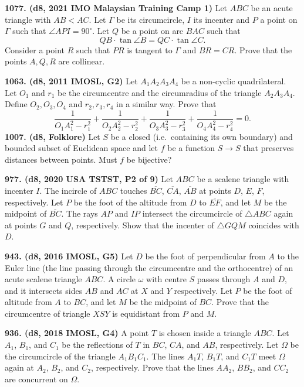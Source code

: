 \documentclass{article}
\begin{document}
\textbf{1077. (\color{red}d8\color{black}, 2021 IMO Malaysian Training Camp 1)} Let $ABC$ be an acute triangle with $AB<AC$. Let $\Gamma$ be its circumcircle, $I$ its incenter and $P$ a point on $\Gamma$ such that $\angle API=90^{\circ}$. Let $Q$ be a point on arc $BAC$ such that $$QB\cdot\tan \angle B=QC\cdot \tan \angle C.$$ Consider a point $R$ such that $PR$ is tangent to $\Gamma$ and $BR=CR$. Prove that the points $A, Q, R$ are collinear.

\textbf{1063. (\color{red}d8\color{black}, 2011 IMOSL, G2)} Let $A_1A_2A_3A_4$ be a non-cyclic quadrilateral. Let $O_1$ and $r_1$ be the circumcentre and the circumradius of the triangle $A_2A_3A_4$. Define $O_2,O_3,O_4$ and $r_2,r_3,r_4$ in a similar way. Prove that
\[\frac{1}{O_1A_1^2-r_1^2}+\frac{1}{O_2A_2^2-r_2^2}+\frac{1}{O_3A_3^2-r_3^2}+\frac{1}{O_4A_4^2-r_4^2}=0.\]
\textbf{1007. (\color{red}d8\color{black}, Folklore)} Let $S$ be a closed (i.e.\ containing its own boundary) and bounded subset of Euclidean space and let $f$ be a function $S \to S$ that preserves distances between points. Must $f$ be bijective?

\textbf{977. (\color{red}d8\color{black}, 2020 USA TSTST, P2 of 9)} Let $ABC$ be a scalene triangle with incenter $I$. The incircle of $ABC$ touches $\overline{BC}$, $\overline{CA}$, $\overline{AB}$ at points $D$, $E$, $F$, respectively. Let $P$ be the foot of the altitude from $D$ to $\overline{EF}$, and let $M$ be the midpoint of $\overline{BC}$. The rays $AP$ and $IP$ intersect the circumcircle of $\triangle{ABC}$ again at points $G$ and $Q$, respectively. Show that the incenter of $\triangle{GQM}$ coincides with $D$.

\textbf{943. (\color{red}d8\color{black}, 2016 IMOSL, G5)} Let $D$ be the foot of perpendicular from $A$ to the Euler line (the line passing through the circumcentre and the orthocentre) of an acute scalene triangle $ABC$. A circle $\omega$ with centre $S$ passes through $A$ and $D$, and it intersects sides $AB$ and $AC$ at $X$ and $Y$ respectively. Let $P$ be the foot of altitude from $A$ to $BC$, and let $M$ be the midpoint of $BC$. Prove that the circumcentre of triangle $XSY$ is equidistant from $P$ and $M$.

\textbf{936. (\color{red}d8\color{black}, 2018 IMOSL, G4)} A point $T$ is chosen inside a triangle $ABC$. Let $A_1$, $B_1$, and $C_1$ be the reflections of $T$ in $BC$, $CA$, and $AB$, respectively. Let $\Omega$ be the circumcircle of the triangle $A_1B_1C_1$. The lines $A_1T$, $B_1T$, and $C_1T$ meet $\Omega$ again at $A_2$, $B_2$, and $C_2$, respectively. Prove that the lines $AA_2$, $BB_2$, and $CC_2$ are concurrent on $\Omega$.
\end{document}
